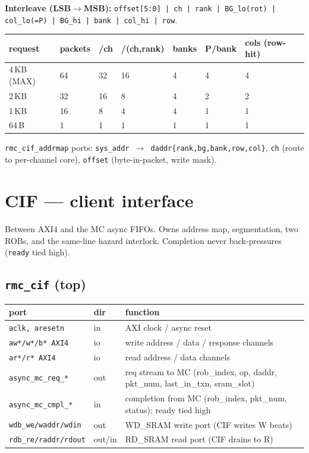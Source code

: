 \documentclass[10pt]{article}
\newcommand{\sig}[1]{\texttt{\small #1}}
\newcommand{\blk}[1]{\textbf{#1}}
\begin{document}
\noindent\textbf{Interleave (LSB$\to$MSB):}
\sig{offset[5:0] | ch | rank | BG_lo(rot) | col_lo(=P) | BG_hi | bank | col_hi | row}.

\begin{center}\footnotesize
\begin{tabular}{llll llll}
\toprule
request & packets & /ch & /(ch,rank) & banks & P/bank & cols (row-hit)\\ \midrule
4\,KB (MAX) & 64 & 32 & 16 & 4 & 4 & 4\\
2\,KB & 32 & 16 & 8 & 4 & 2 & 2\\
1\,KB & 16 & 8 & 4 & 4 & 1 & 1\\
64\,B & 1 & 1 & 1 & 1 & 1 & 1\\
\bottomrule
\end{tabular}
\end{center}

\noindent\sig{rmc\_cif\_addrmap} ports: \sig{sys_addr $\to$ daddr\{rank,bg,bank,row,col\}},
\sig{ch} (route to per-channel core), \sig{offset} (byte-in-packet, write mask).

\section{CIF --- client interface}
Between AXI4 and the MC async FIFOs. Owns address map, segmentation, two ROBs, and the
same-line hazard interlock. Completion never back-pressures (\sig{ready} tied high).

\subsection{\texttt{rmc\_cif} (top)}
\begin{longtable}{P{4.2cm} P{1.3cm} P{9.0cm}}
\toprule
\blk{port} & \blk{dir} & \blk{function}\\ \midrule \endhead
\sig{aclk, aresetn} & in & AXI clock / async reset\\
\sig{aw*/w*/b* AXI4} & io & write address / data / response channels\\
\sig{ar*/r* AXI4} & io & read address / data channels\\
\sig{async_mc_req_*} & out & req stream to MC (rob\_index, op, daddr, pkt\_num, last\_in\_txn, sram\_slot)\\
\sig{async_mc_cmpl_*} & in & completion from MC (rob\_index, pkt\_num, status); ready tied high\\
\sig{wdb_we/waddr/wdin} & out & WD\_SRAM write port (CIF writes W beats)\\
\sig{rdb_re/raddr/rdout} & out/in & RD\_SRAM read port (CIF drains to R)\\
\bottomrule
\end{longtable}
\end{document}
